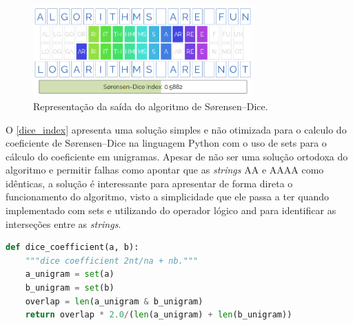 \begin{figure}[h]
  \centering
  \includegraphics[width=0.75\textwidth]{figuras/dice}
  \caption{Representação da saída do algoritmo de Sørensen–Dice\protect\footnotemark.}
  \label{fig:dice_example}
\end{figure}

O \autoref{dice_index} apresenta uma solução simples e não otimizada para o calculo do coeficiente de Sørensen–Dice na linguagem Python com o uso de {\code sets} para o cálculo do coeficiente em unigramas. Apesar de não ser uma solução ortodoxa do algoritmo e permitir falhas como apontar que as \textit{strings} {\code AA} e {\code AAAA} como idênticas, a solução é interessante para apresentar de forma direta o funcionamento do algoritmo, visto a simplicidade que ele passa a ter quando implementado com {\code sets} e utilizando do operador lógico {\code and} para identificar as interseções entre as \textit{strings}.

\begin{lstlisting}[language=Python,label=dice_index,caption={Simples implementação do coeficiente de Sørensen–Dice}]
def dice_coefficient(a, b):
    """dice coefficient 2nt/na + nb."""
    a_unigram = set(a)
    b_unigram = set(b)
    overlap = len(a_unigram & b_unigram)
    return overlap * 2.0/(len(a_unigram) + len(b_unigram))
\end{lstlisting}




